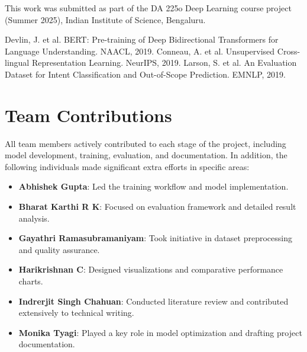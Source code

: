 \documentclass{ecai}
\begin{document}
\ack This work was submitted as part of the DA 225o Deep Learning course project (Summer 2025), Indian Institute of Science, Bengaluru.


\begin{thebibliography}{}
 Devlin, J. et al. BERT: Pre-training of Deep Bidirectional Transformers for Language Understanding. NAACL, 2019.
 Conneau, A. et al. Unsupervised Cross-lingual Representation Learning. NeurIPS, 2019.
 Larson, S. et al. An Evaluation Dataset for Intent Classification and Out-of-Scope Prediction. EMNLP, 2019.
\end{thebibliography}

\newpage
\section*{Team Contributions}
All team members actively contributed to each stage of the project, including model development, training, evaluation, and documentation. In addition, the following individuals made significant extra efforts in specific areas:

\begin{itemize}
    \item \textbf{Abhishek Gupta}: Led the training workflow and model implementation.
    \item \textbf{Bharat Karthi R K}: Focused on evaluation framework and detailed result analysis.
    \item \textbf{Gayathri Ramasubramaniyam}: Took initiative in dataset preprocessing and quality assurance.
    \item \textbf{Harikrishnan C}: Designed visualizations and comparative performance charts.
    \item \textbf{Indrerjit Singh Chahuan}: Conducted literature review and contributed extensively to technical writing.
    \item \textbf{Monika Tyagi}: Played a key role in model optimization and drafting project documentation.
\end{itemize}
\end{document}
